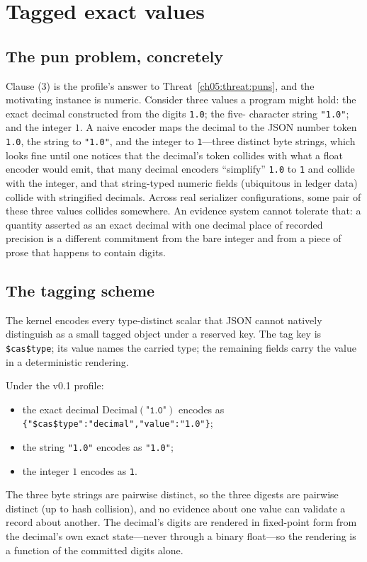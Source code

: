 \section{Tagged exact values}\label{ch05:decimal}

\subsection{The pun problem, concretely}

Clause (3) is the profile's answer to Threat~\ref{ch05:threat:puns}, and the
motivating instance is numeric. Consider three values a program might hold:
the exact decimal constructed from the digits \texttt{1.0}; the five-
character string \texttt{"1.0"}; and the integer $1$. A naive encoder maps
the decimal to the JSON number token \texttt{1.0}, the string to
\texttt{"1.0"}, and the integer to \texttt{1}---three distinct byte
strings, which looks fine until one notices that the decimal's token
collides with what a float encoder would emit, that many decimal encoders
``simplify'' \texttt{1.0} to \texttt{1} and collide with the integer, and
that string-typed numeric fields (ubiquitous in ledger data) collide with
stringified decimals. Across real serializer configurations, some pair of
these three values collides somewhere. An evidence system cannot tolerate
that: a quantity asserted as an exact decimal with one decimal place of
recorded precision is a different commitment from the bare integer and
from a piece of prose that happens to contain digits.

\subsection{The tagging scheme}

The kernel encodes every type-distinct scalar that JSON cannot natively
distinguish as a small tagged object under a reserved key. The tag key is
\texttt{\$cas\$type}; its value names the carried type; the remaining fields
carry the value in a deterministic rendering.

\begin{example}\label{ch05:ex:decimal}
Under the v0.1 profile:
\begin{itemize}
\item the exact decimal $\mathrm{Decimal}(\texttt{"1.0"})$ encodes as
\texttt{\{"\$cas\$type":"decimal","value":"1.0"\}};
\item the string \texttt{"1.0"} encodes as \texttt{"1.0"};
\item the integer $1$ encodes as \texttt{1}.
\end{itemize}
The three byte strings are pairwise distinct, so the three digests are
pairwise distinct (up to hash collision), and no evidence about one value
can validate a record about another. The decimal's digits are rendered in
fixed-point form from the decimal's own exact state---never through a
binary float---so the rendering is a function of the committed digits
alone.
\end{example}

